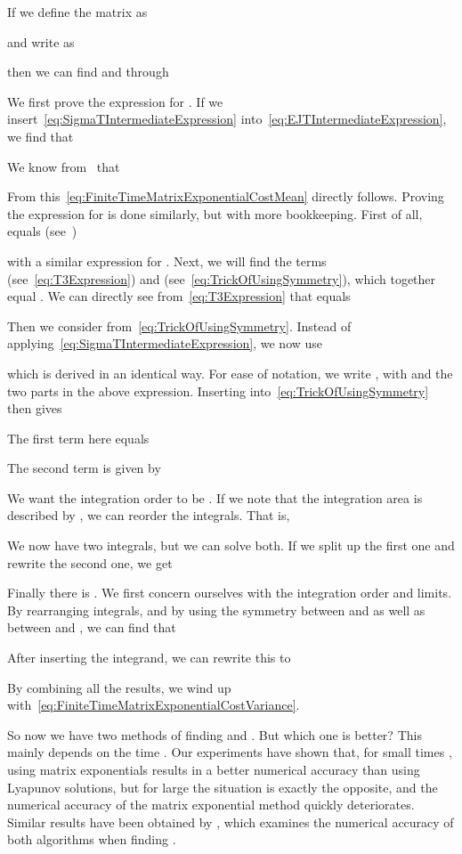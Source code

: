 \documentclass[twocolumn]{autart}
\begin{document}
\begin{thm}\label{th:MatrixExponentialsForCostMeanAndVariance}
If we define the matrix  as

and write  as

then we can find  and  through

\end{thm}
\begin{pf}
We first prove the expression for . If we insert~\eqref{eq:SigmaTIntermediateExpression} into~\eqref{eq:EJTIntermediateExpression}, we find that

We know from~\cite{MatrixExponentials} that

From this~\eqref{eq:FiniteTimeMatrixExponentialCostMean} directly follows. Proving the expression for  is done similarly, but with more bookkeeping. First of all,  equals (see~\cite{MatrixExponentials})

with a similar expression for . Next, we will find the terms  (see~\eqref{eq:T3Expression}) and  (see~\eqref{eq:TrickOfUsingSymmetry}), which together equal . We can directly see from~\eqref{eq:T3Expression} that  equals

Then we consider  from~\eqref{eq:TrickOfUsingSymmetry}. Instead of applying~\eqref{eq:SigmaTIntermediateExpression}, we now use

which is derived in an identical way. For ease of notation, we write , with  and  the two parts in the above expression. Inserting  into~\eqref{eq:TrickOfUsingSymmetry} then gives

The first term  here equals

The second term  is given by

We want the integration order to be . If we note that the integration area is described by , we can reorder the integrals. That is,

We now have two integrals, but we can solve both. If we split up the first one and rewrite the second one, we get

Finally there is . We first concern ourselves with the integration order and limits. By rearranging integrals, and by using the symmetry between  and  as well as between  and , we can find that

After inserting the integrand, we can rewrite this to

By combining all the results, we wind up with~\eqref{eq:FiniteTimeMatrixExponentialCostVariance}.
\end{pf}

So now we have two methods of finding  and . But which one is better? This mainly depends on the time . Our experiments have shown that, for small times , using matrix exponentials results in a better numerical accuracy than using Lyapunov solutions, but for large  the situation is exactly the opposite, and the numerical accuracy of the matrix exponential method quickly deteriorates. Similar results have been obtained by \cite{LyapunovEquationSolutions}, which examines the numerical accuracy of both algorithms when finding .
\end{document}
